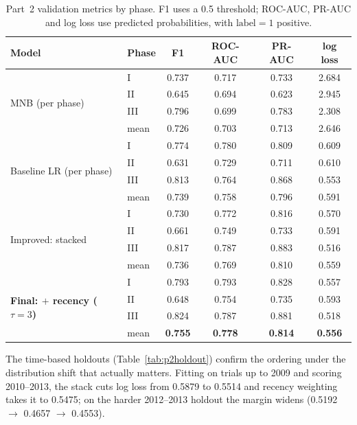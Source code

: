 \begin{table}[t]
\centering\small
\setlength{\tabcolsep}{4pt}
\begin{tabular}{llcccc}
\toprule
Model & Phase & F1 & ROC-AUC & PR-AUC & log loss \\
\midrule
\multirow{4}{*}{MNB (per phase)}
 & I    & 0.737 & 0.717 & 0.733 & 2.684 \\
 & II   & 0.645 & 0.694 & 0.623 & 2.945 \\
 & III  & 0.796 & 0.699 & 0.783 & 2.308 \\
 & mean & 0.726 & 0.703 & 0.713 & 2.646 \\
\midrule
\multirow{4}{*}{Baseline LR (per phase)}
 & I    & 0.774 & 0.780 & 0.809 & 0.609 \\
 & II   & 0.631 & 0.729 & 0.711 & 0.610 \\
 & III  & 0.813 & 0.764 & 0.868 & 0.553 \\
 & mean & 0.739 & 0.758 & 0.796 & 0.591 \\
\midrule
\multirow{4}{*}{Improved: stacked}
 & I    & 0.730 & 0.772 & 0.816 & 0.570 \\
 & II   & 0.661 & 0.749 & 0.733 & 0.591 \\
 & III  & 0.817 & 0.787 & 0.883 & 0.516 \\
 & mean & 0.736 & 0.769 & 0.810 & 0.559 \\
\midrule
\multirow{4}{*}{\textbf{Final: $+$ recency ($\tau{=}3$)}}
 & I    & 0.793 & 0.793 & 0.828 & 0.557 \\
 & II   & 0.648 & 0.754 & 0.735 & 0.593 \\
 & III  & 0.824 & 0.787 & 0.881 & 0.518 \\
 & mean & \textbf{0.755} & \textbf{0.778} & \textbf{0.814} & \textbf{0.556} \\
\bottomrule
\end{tabular}
\caption{Part~2 validation metrics by phase. F1 uses a 0.5 threshold; ROC-AUC,
PR-AUC and log loss use predicted probabilities, with $\text{label}=1$ positive.}
\label{tab:p2val}
\end{table}

The time-based holdouts (Table~\ref{tab:p2holdout}) confirm the ordering under the
distribution shift that actually matters. Fitting on trials up to 2009 and scoring
2010--2013, the stack cuts log loss from 0.5879 to 0.5514 and recency weighting
takes it to 0.5475; on the harder 2012--2013 holdout the margin widens (0.5192
$\to$ 0.4657 $\to$ 0.4553).

